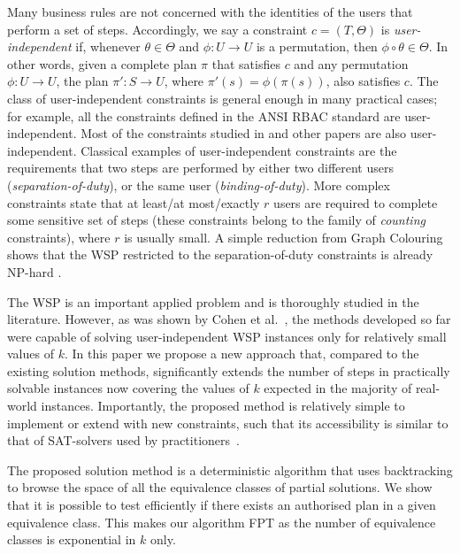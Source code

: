 \documentclass[runningheads,proof]{llncs}
\begin{document}
Many business rules are not concerned with the identities of the users that perform a set of steps.  Accordingly, we say a constraint $c = (T,\Theta)$ is \emph{user-independent} if, whenever $\theta \in \Theta$ and $\phi: U \rightarrow U$ is a permutation, then $\phi \circ \theta \in \Theta$. 
In other words, given a complete plan $\pi$ that satisfies $c$ and any permutation $\phi: U \rightarrow U$, the plan $\pi' : S \rightarrow U$, where $\pi'(s) = \phi(\pi(s))$, also satisfies $c$.
The class of user-independent constraints is general enough in many practical cases; for example, all the constraints defined in the ANSI RBAC standard \cite{ANSI04} are user-independent. 
Most of the constraints studied in \cite{FAW2014,JOCO2014,CrGuYe13,WaLi10} and other papers are also user-independent. 
Classical examples of user-independent constraints are the requirements that two steps are performed by either two different users ({\em separation-of-duty}), or the same user ({\em binding-of-duty}). More complex constraints state that at least/at most/exactly $r$ users are required to complete some sensitive set of steps (these constraints belong to the family of \emph{counting} constraints), where $r$ is usually small. 
A simple reduction from {\sc Graph Colouring} shows that the WSP restricted to the separation-of-duty constraints is already NP-hard \cite{WaLi10}.

The WSP is an important applied problem and is thoroughly studied
in the literature.  However, as was shown by Cohen et al.~\cite{FAW2014}, 
the methods developed so far  were 
capable of solving user-independent WSP instances only for relatively small values of $k$.  
In this paper we propose a new approach that, compared to the existing solution methods, significantly extends the number of steps in practically solvable instances now covering the values of $k$ expected in the majority of real-world instances. 
Importantly, the proposed method is relatively simple to implement or extend with new constraints, such that its accessibility is similar to that of SAT-solvers used by practitioners~\cite{WaLi10}.



The proposed solution method is a deterministic algorithm that uses backtracking to browse the space of all the equivalence classes of partial solutions. 
We show that it is possible to test efficiently if there exists an authorised plan in a given equivalence class.
This makes our algorithm FPT as the number of equivalence classes is exponential in $k$ only.
\end{document}

